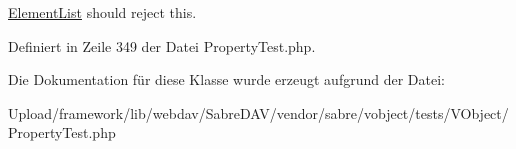 \mbox{\hyperlink{class_sabre_1_1_v_object_1_1_element_list}{Element\+List}} should reject this.

Definiert in Zeile 349 der Datei Property\+Test.\+php.



Die Dokumentation für diese Klasse wurde erzeugt aufgrund der Datei\+:\begin{DoxyCompactItemize}
\item 
Upload/framework/lib/webdav/\+Sabre\+D\+A\+V/vendor/sabre/vobject/tests/\+V\+Object/Property\+Test.\+php\end{DoxyCompactItemize}
